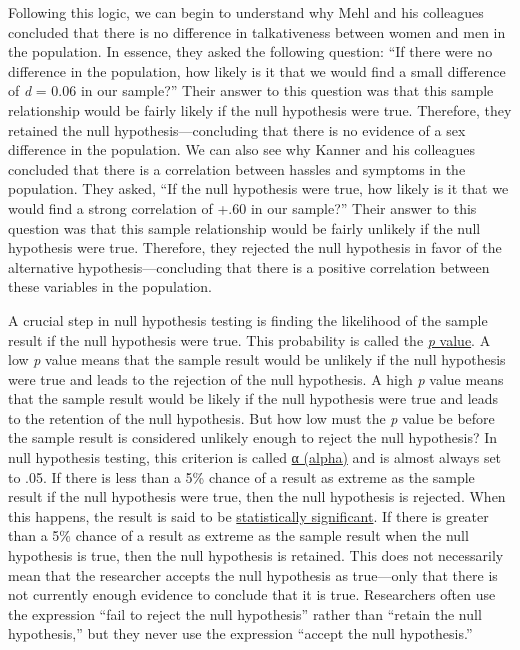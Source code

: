 \documentclass[
]{krantz}
\begin{document}
Following this logic, we can begin to understand why Mehl and his colleagues concluded that there is no difference in talkativeness between women and men in the population. In essence, they asked the following question: ``If there were no difference in the population, how likely is it that we would find a small difference of \emph{d} = 0.06 in our sample?'' Their answer to this question was that this sample relationship would be fairly likely if the null hypothesis were true. Therefore, they retained the null hypothesis---concluding that there is no evidence of a sex difference in the population. We can also see why Kanner and his colleagues concluded that there is a correlation between hassles and symptoms in the population. They asked, ``If the null hypothesis were true, how likely is it that we would find a strong correlation of +.60 in our sample?'' Their answer to this question was that this sample relationship would be fairly unlikely if the null hypothesis were true. Therefore, they rejected the null hypothesis in favor of the alternative hypothesis---concluding that there is a positive correlation between these variables in the population.

A crucial step in null hypothesis testing is finding the likelihood of the sample result if the null hypothesis were true. This probability is called the \protect\hyperlink{p-value}{\emph{p} value}. A low \emph{p} value means that the sample result would be unlikely if the null hypothesis were true and leads to the rejection of the null hypothesis. A high \emph{p} value means that the sample result would be likely if the null hypothesis were true and leads to the retention of the null hypothesis. But how low must the \emph{p} value be before the sample result is considered unlikely enough to reject the null hypothesis? In null hypothesis testing, this criterion is called \protect\hyperlink{ux3b1-alpha}{α (alpha)} and is almost always set to .05. If there is less than a 5\% chance of a result as extreme as the sample result if the null hypothesis were true, then the null hypothesis is rejected. When this happens, the result is said to be \protect\hyperlink{statistically-significant}{statistically significant}. If there is greater than a 5\% chance of a result as extreme as the sample result when the null hypothesis is true, then the null hypothesis is retained. This does not necessarily mean that the researcher accepts the null hypothesis as true---only that there is not currently enough evidence to conclude that it is true. Researchers often use the expression ``fail to reject the null hypothesis'' rather than ``retain the null hypothesis,'' but they never use the expression ``accept the null hypothesis.''
\end{document}
